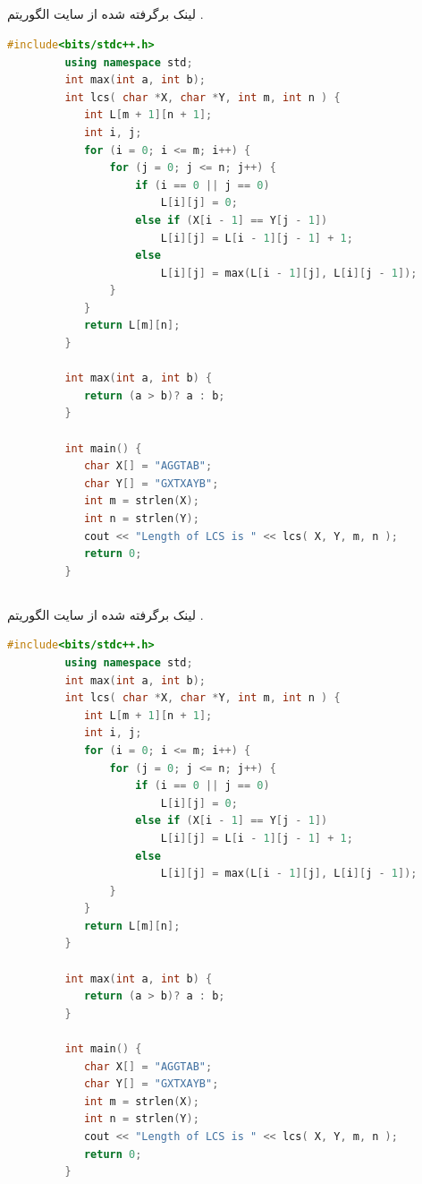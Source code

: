 \documentclass[a4paper,12pt]{report}
\begin{document}
	\subsection{}\label{subsec6:sec1:chap1}
	لینک برگرفته شده از سایت
	\hyperref{https://www.geeksforgeeks.org}{algorithmSite}{geeksforgeeks}{}
	الگوریتم
	\hyperref{https://www.geeksforgeeks.org/k-dimensional-tree/}{LCS}{geeksforgeeks}
	{}.
	\cite{Geeksfor41:online}
	\begin{latin}
		\small
		\begin{lstlisting}[language=C++]
		 #include<bits/stdc++.h>
		 using namespace std;
		 int max(int a, int b);
		 int lcs( char *X, char *Y, int m, int n ) {
		 	int L[m + 1][n + 1];
		 	int i, j;
		 	for (i = 0; i <= m; i++) {
		 		for (j = 0; j <= n; j++) {
		 			if (i == 0 || j == 0)
		 				L[i][j] = 0;
		 			else if (X[i - 1] == Y[j - 1])
		 				L[i][j] = L[i - 1][j - 1] + 1;
		 			else
		 				L[i][j] = max(L[i - 1][j], L[i][j - 1]);
		 		}
		 	}
		 	return L[m][n];
		 }

		 int max(int a, int b) {
		 	return (a > b)? a : b;
		 }

		 int main() {
		 	char X[] = "AGGTAB";
		 	char Y[] = "GXTXAYB";
		 	int m = strlen(X);
		 	int n = strlen(Y);
		 	cout << "Length of LCS is "	<< lcs( X, Y, m, n );
		 	return 0;
		 }
		\end{lstlisting}
	\end{latin}

	\subsection{}\label{subsec6:sec1:chap1}
	لینک برگرفته شده از سایت
	\hyperref{https://www.geeksforgeeks.org}{algorithmSite}{geeksforgeeks}{}
	الگوریتم
	\hyperref{https://www.geeksforgeeks.org/k-dimensional-tree/}{LCS}{geeksforgeeks}
	{}.
	\cite{Geeksfor41:online}
	\begin{latin}
		\small
		\begin{lstlisting}[language=C++]
		 #include<bits/stdc++.h>
		 using namespace std;
		 int max(int a, int b);
		 int lcs( char *X, char *Y, int m, int n ) {
		 	int L[m + 1][n + 1];
		 	int i, j;
		 	for (i = 0; i <= m; i++) {
		 		for (j = 0; j <= n; j++) {
		 			if (i == 0 || j == 0)
		 				L[i][j] = 0;
		 			else if (X[i - 1] == Y[j - 1])
		 				L[i][j] = L[i - 1][j - 1] + 1;
		 			else
		 				L[i][j] = max(L[i - 1][j], L[i][j - 1]);
		 		}
		 	}
		 	return L[m][n];
		 }

		 int max(int a, int b) {
		 	return (a > b)? a : b;
		 }

		 int main() {
		 	char X[] = "AGGTAB";
		 	char Y[] = "GXTXAYB";
		 	int m = strlen(X);
		 	int n = strlen(Y);
		 	cout << "Length of LCS is "	<< lcs( X, Y, m, n );
		 	return 0;
		 }
		\end{lstlisting}
	\end{latin}
\end{document}
